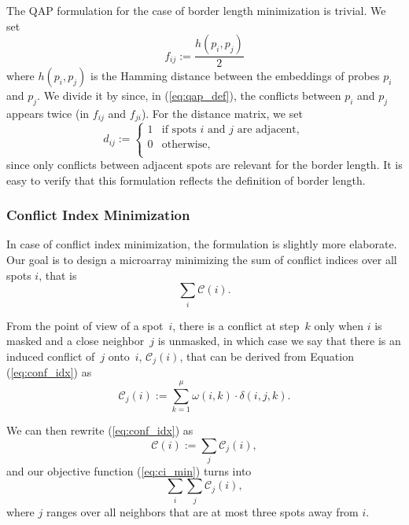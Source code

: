 \documentclass{bioinfo}
\begin{document}
The QAP formulation for the case of border length minimization is trivial. We set
\begin{equation}
f_{ij} := \frac{h(p_i, p_j)}{2}
\end{equation}
where $h(p_i, p_j)$ is the Hamming distance between the embeddings of probes $p_i$ and $p_j$. We divide it by since, in (\ref{eq:qap_def}), the conflicts between $p_i$ and $p_j$ appears twice (in $f_{ij}$ and $f_{ji}$). For the distance matrix, we set
\begin{equation}
d_{ij} :=
	\left\{
		\begin{array}{ll}
			1 & \mbox{if spots $i$ and $j$ are adjacent}, \\
			0 & \mbox{otherwise}, \\
		\end{array}
	\right.
\end{equation}
since only conflicts between adjacent spots are relevant for the border length. It is easy to verify that this formulation reflects the definition of border length.

\subsubsection{Conflict Index Minimization}

In case of conflict index minimization, the formulation is slightly more elaborate. Our goal is to design a microarray minimizing the sum of conflict indices over all spots $i$, that is
\begin{equation}
\label{eq:ci_min}
\sum_{i} \mathcal{C}(i).
\end{equation}

From the point of view of a spot~$i$, there is a conflict at step~$k$ only when $i$ is masked and a close neighbor~$j$ is unmasked, in which case we say that there is an induced conflict of~$j$ onto~$i$, $\mathcal{C}_{j}(i)$, that can be derived from Equation (\ref{eq:conf_idx}) as
\begin{equation}
\label{eq:induced_conf_idx}
\mathcal{C}_{j}(i) := \sum_{k=1}^{\mu} \omega(i,k) \cdot \delta(i,j,k).
\end{equation}

We can then rewrite (\ref{eq:conf_idx}) as
\begin{equation}
\mathcal{C}(i) := \sum_{j} \mathcal{C}_{j}(i),
\end{equation}
and our objective function (\ref{eq:ci_min}) turns into
\begin{equation}
\label{eq:ci_min_qap}
\sum_{i} \sum_{j} \mathcal{C}_{j}(i),
\end{equation}
where $j$ ranges over all neighbors that are at most three spots away from $i$.
\end{document}
